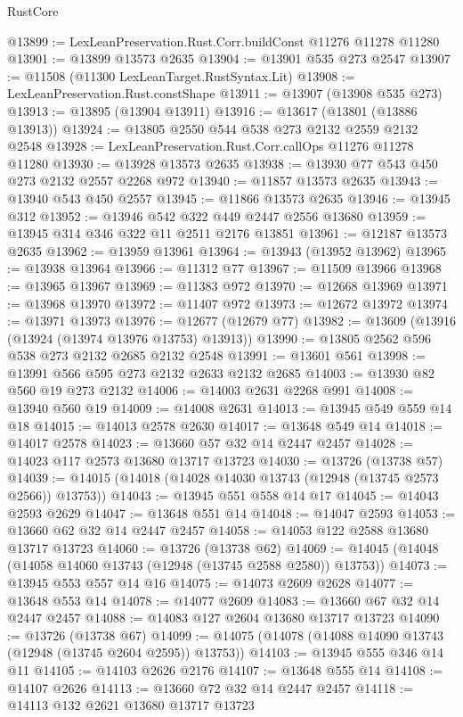 \begin{lexlean}{RustCore}
\begin{coremodule}
@13899 := LexLeanPreservation.Rust.Corr.buildConst @11276 @11278 @11280
@13901 := @13899 @13573 @2635
@13904 := @13901 @535 @273 @2547
@13907 := @11508 (@11300 LexLeanTarget.RustSyntax.Lit)
@13908 := LexLeanPreservation.Rust.constShape
@13911 := @13907 (@13908 @535 @273)
@13913 := @13895 (@13904 @13911)
@13916 := @13617 (@13801 (@13886 @13913))
@13924 := @13805 @2550 @544 @538 @273 @2132 @2559 @2132 @2548
@13928 := LexLeanPreservation.Rust.Corr.callOps @11276 @11278 @11280
@13930 := @13928 @13573 @2635
@13938 := @13930 @77 @543 @450 @273 @2132 @2557 @2268 @972
@13940 := @11857 @13573 @2635
@13943 := @13940 @543 @450 @2557
@13945 := @11866 @13573 @2635
@13946 := @13945 @312
@13952 := @13946 @542 @322 @449 @2447 @2556 @13680
@13959 := @13945 @314 @346 @322 @11 @2511 @2176 @13851
@13961 := @12187 @13573 @2635
@13962 := @13959 @13961
@13964 := @13943 (@13952 @13962)
@13965 := @13938 @13964
@13966 := @11312 @77
@13967 := @11509 @13966
@13968 := @13965 @13967
@13969 := @11383 @972
@13970 := @12668 @13969
@13971 := @13968 @13970
@13972 := @11407 @972
@13973 := @12672 @13972
@13974 := @13971 @13973
@13976 := @12677 (@12679 @77)
@13982 := @13609 (@13916 (@13924 (@13974 @13976 @13753) @13913))
@13990 := @13805 @2562 @596 @538 @273 @2132 @2685 @2132 @2548
@13991 := @13601 @561
@13998 := @13991 @566 @595 @273 @2132 @2633 @2132 @2685
@14003 := @13930 @82 @560 @19 @273 @2132
@14006 := @14003 @2631 @2268 @991
@14008 := @13940 @560 @19
@14009 := @14008 @2631
@14013 := @13945 @549 @559 @14 @18
@14015 := @14013 @2578 @2630
@14017 := @13648 @549 @14
@14018 := @14017 @2578
@14023 := @13660 @57 @32 @14 @2447 @2457
@14028 := @14023 @117 @2573 @13680 @13717 @13723
@14030 := @13726 (@13738 @57)
@14039 := @14015 (@14018 (@14028 @14030 @13743 (@12948 (@13745 @2573 @2566)) @13753))
@14043 := @13945 @551 @558 @14 @17
@14045 := @14043 @2593 @2629
@14047 := @13648 @551 @14
@14048 := @14047 @2593
@14053 := @13660 @62 @32 @14 @2447 @2457
@14058 := @14053 @122 @2588 @13680 @13717 @13723
@14060 := @13726 (@13738 @62)
@14069 := @14045 (@14048 (@14058 @14060 @13743 (@12948 (@13745 @2588 @2580)) @13753))
@14073 := @13945 @553 @557 @14 @16
@14075 := @14073 @2609 @2628
@14077 := @13648 @553 @14
@14078 := @14077 @2609
@14083 := @13660 @67 @32 @14 @2447 @2457
@14088 := @14083 @127 @2604 @13680 @13717 @13723
@14090 := @13726 (@13738 @67)
@14099 := @14075 (@14078 (@14088 @14090 @13743 (@12948 (@13745 @2604 @2595)) @13753))
@14103 := @13945 @555 @346 @14 @11
@14105 := @14103 @2626 @2176
@14107 := @13648 @555 @14
@14108 := @14107 @2626
@14113 := @13660 @72 @32 @14 @2447 @2457
@14118 := @14113 @132 @2621 @13680 @13717 @13723

\end{coremodule}
\end{lexlean}
